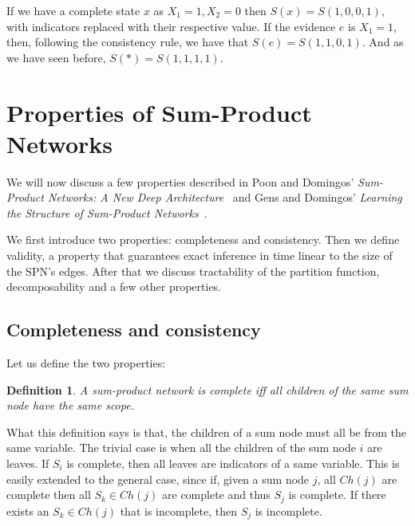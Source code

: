 \documentclass[a4paper,10pt]{article}
\theoremstyle{plain}
\newtheorem*{spn-def}{Definition}
\begin{document}
If we have a complete state $x$ as $X_1=1,X_2=0$ then $S(x)=S(1,0,0,1)$, with indicators replaced
with their respective value. If the evidence $e$ is $X_1=1$, then, following the consistency rule,
we have that $S(e)=S(1,1,0,1)$. And as we have seen before, $S(*)=S(1,1,1,1)$.

\newpage

\section{Properties of Sum-Product Networks}

We will now discuss a few properties described in Poon and Domingos' \textit{Sum-Product Networks:
A New Deep Architecture}~\cite{poon-domingos} and Gens and Domingos' \textit{Learning the Structure
of Sum-Product Networks}~\cite{gens-domingos}.

We first introduce two properties: completeness and consistency. Then we define validity, a
property that guarantees exact inference in time linear to the size of the SPN's edges. After that
we discuss tractability of the partition function, decomposability and a few other properties.

\subsection{Completeness and consistency}

Let us define the two properties:

\begin{spn-def}
  A sum-product network is complete iff all children of the same sum node have the same scope.
\end{spn-def}

What this definition says is that, the children of a sum node must all be from the same variable.
The trivial case is when all the children of the sum node $i$ are leaves. If $S_i$ is complete,
then all leaves are indicators of a same variable. This is easily extended to the general case,
since if, given a sum node $j$, all $Ch(j)$ are complete then all $S_k\in Ch(j)$ are complete and
thus $S_j$ is complete. If there exists an $S_k\in Ch(j)$ that is incomplete, then $S_j$ is
incomplete.
\end{document}
